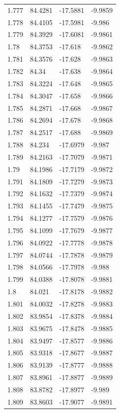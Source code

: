 \begin{tabular}{llll}
1.777 & 84.4281 & -17.5881 & -9.9859 \\
1.778 & 84.4105 & -17.5981 & -9.986 \\
1.779 & 84.3929 & -17.6081 & -9.9861 \\
1.78 & 84.3753 & -17.618 & -9.9862 \\
1.781 & 84.3576 & -17.628 & -9.9863 \\
1.782 & 84.34 & -17.638 & -9.9864 \\
1.783 & 84.3224 & -17.648 & -9.9865 \\
1.784 & 84.3047 & -17.658 & -9.9866 \\
1.785 & 84.2871 & -17.668 & -9.9867 \\
1.786 & 84.2694 & -17.678 & -9.9868 \\
1.787 & 84.2517 & -17.688 & -9.9869 \\
1.788 & 84.234 & -17.6979 & -9.987 \\
1.789 & 84.2163 & -17.7079 & -9.9871 \\
1.79 & 84.1986 & -17.7179 & -9.9872 \\
1.791 & 84.1809 & -17.7279 & -9.9873 \\
1.792 & 84.1632 & -17.7379 & -9.9874 \\
1.793 & 84.1455 & -17.7479 & -9.9875 \\
1.794 & 84.1277 & -17.7579 & -9.9876 \\
1.795 & 84.1099 & -17.7679 & -9.9877 \\
1.796 & 84.0922 & -17.7778 & -9.9878 \\
1.797 & 84.0744 & -17.7878 & -9.9879 \\
1.798 & 84.0566 & -17.7978 & -9.988 \\
1.799 & 84.0388 & -17.8078 & -9.9881 \\
1.8 & 84.021 & -17.8178 & -9.9882 \\
1.801 & 84.0032 & -17.8278 & -9.9883 \\
1.802 & 83.9854 & -17.8378 & -9.9884 \\
1.803 & 83.9675 & -17.8478 & -9.9885 \\
1.804 & 83.9497 & -17.8577 & -9.9886 \\
1.805 & 83.9318 & -17.8677 & -9.9887 \\
1.806 & 83.9139 & -17.8777 & -9.9888 \\
1.807 & 83.8961 & -17.8877 & -9.9889 \\
1.808 & 83.8782 & -17.8977 & -9.989 \\
1.809 & 83.8603 & -17.9077 & -9.9891 \\

\end{tabular}

